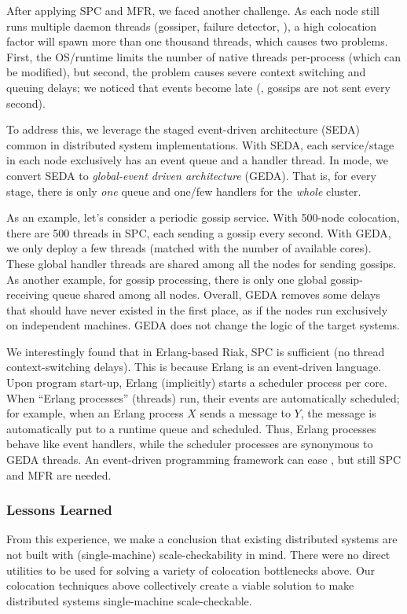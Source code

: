 After applying SPC and MFR, we faced another challenge.  As each node
still runs multiple daemon threads (gossiper, failure detector, \etc), a
high colocation factor will spawn more than one thousand threads, which
causes two problems.  First, the OS/runtime limits the number of native
threads per-process (which can be modified), but second, the problem
causes severe context switching and queuing delays; we noticed that
events become late (\eg, gossips are not sent every second).


To address this, we leverage the staged event-driven architecture (SEDA)
\cite{Welsh+01-Seda} common in distributed system implementations.  With
SEDA, each service/stage in each node exclusively has an event queue and a
handler thread.  In \stest mode, we convert SEDA to {\em global-event
  driven architecture} (GEDA).  That is, for every stage, there is only
{\em one} queue and one/few handlers for the {\em whole} cluster.

As an example, let's consider a periodic gossip service.  With 500-node
colocation, there are 500 threads in SPC, each sending a gossip every
second.  With GEDA, we only deploy a few threads (matched with the number
of available cores).  These global handler threads are shared among all
the nodes for sending gossips.  As another example, for gossip processing,
there is only one global gossip-receiving queue shared among all nodes.
%
Overall, GEDA removes some delays that should have never existed in the
first place, as if the nodes run exclusively on independent machines.
GEDA does not change the logic of the target systems.


We interestingly found that in Erlang-based Riak, SPC is sufficient (no
thread context-switching delays).
This is because Erlang is an event-driven language.
%
Upon program start-up, Erlang (implicitly) starts a
scheduler process per core.
%
When ``Erlang processes'' (threads) run, their
events are automatically scheduled; 
for example, when an Erlang process $X$ sends a message to $Y$,
the message is automatically put to a runtime queue and scheduled.
%
Thus, Erlang processes behave like event handlers, while the
scheduler processes are synonymous to GEDA threads.
%
An event-driven programming framework can ease \sck, but
still SPC and MFR are needed.


\subsubsection{Lessons Learned}


From this experience, we make a conclusion that existing distributed
systems are not built with (single-machine) scale-checkability in mind.
There were no direct utilities to be used for solving a variety of
colocation bottlenecks above.  Our colocation techniques above
collectively create a viable solution to make distributed systems
single-machine scale-checkable.  


